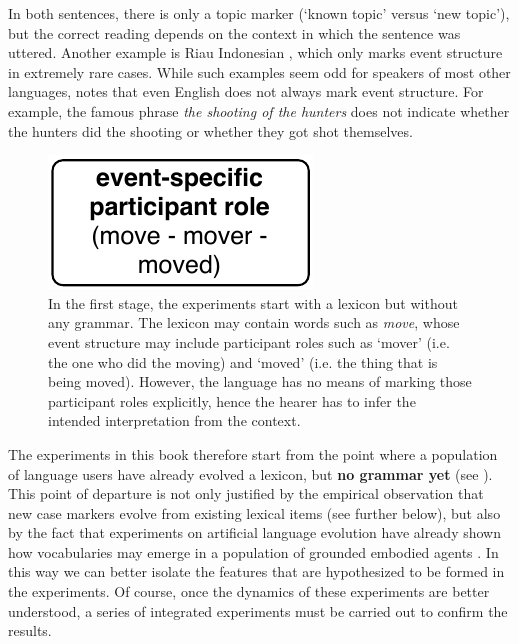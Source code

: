 In both sentences, there is only a topic marker (`known topic' versus `new topic'), but the correct reading depends on the context in which the sentence was uttered. Another example is Riau Indonesian \citep{gil08how}, which only marks event structure in extremely rare cases. While such examples seem odd for speakers of most other languages, \citet[23]{palmer94grammatical} notes that even English does not always mark event structure. For example, the famous phrase {\em the shooting of the hunters} does not indicate whether the hunters did the shooting or whether they got shot themselves.

\begin{figure}[t]
\centerline{\includegraphics[scale=0.6]{chap-introduction/figs/stage1}}
    \caption[Formation of case markers: stage II]{In the first stage, the experiments start with a lexicon but without any grammar. The lexicon may contain words such as {\em move}, whose event structure may include participant roles such as `mover' (i.e. the one who did the moving) and `moved' (i.e. the thing that is being moved). However, the language has no means of marking those participant roles explicitly, hence the hearer has to infer the intended interpretation from the context.}
      \label{f:stage1}
\end{figure}

The experiments in this book therefore start from the point where a population of language users have already evolved a lexicon, but {\bfseries no grammar yet} (see ). This point of departure is not only justified by the empirical observation that new case markers evolve from existing lexical items (see further below), but also by the fact that experiments on artificial language evolution have already shown how vocabularies may emerge in a population of grounded embodied agents \citep[e.g.][]{steels96emergent, steels96selforganizing, steels97selforganizing}. In this way we can better isolate the features that are hypothesized to be formed in the experiments. Of course, once the dynamics of these experiments are better understood, a series of integrated experiments must be carried out to confirm the results.

